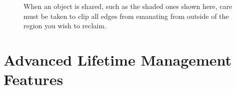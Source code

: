 \begin{figure}
\centering
{}
\qquad
{}
	\caption{When an object is shared, such as the shaded ones shown
	here, care must be taken to clip all edges from emanating from outside of the
	region you wish to reclaim.}
	\label{fig:reachability-sharing}
\end{figure}

\section{Advanced Lifetime Management Features}
 

